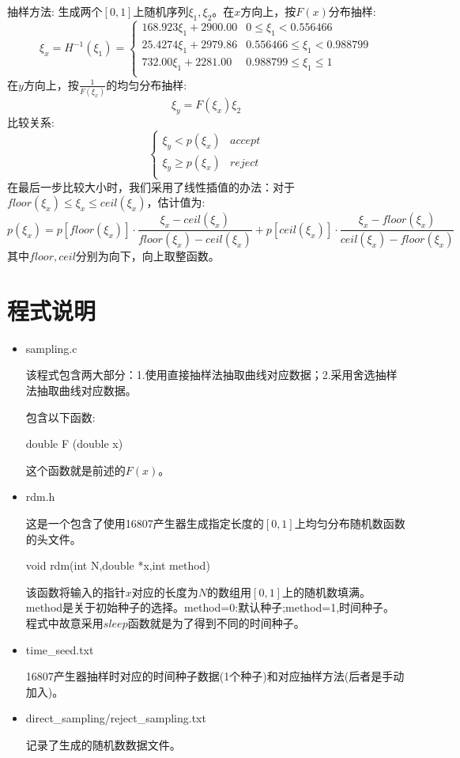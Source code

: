 \documentclass[UTF8]{ctexart}
\begin{document}
\begin{itemize}
	抽样方法:
	生成两个$[0,1]$上随机序列$\xi_1
	,\xi_2$。在$x$方向上，按$F(x)$分布抽样:$$\xi_x=H^{-1}(\xi_1)=\left\{
	\begin{array}{ll}
    168.923\xi_1+2900.00& 0\leq \xi_1<0.556466\\
	25.4274\xi_1+2979.86 & 0.556466\leq \xi_1 <0.988799\\
	732.00\xi_1+2281.00 & 0.988799\leq \xi_1 \leq 1\\
	\end{array}
	\right.$$
	在$y$方向上，按$\frac{1}{F(\xi_x)}$的均匀分布抽样:$$\xi_y=F(\xi_x)\xi_2$$
	比较关系:
	$$\left\{
	\begin{array}{lc}
	\xi_y<p(\xi_x)& accept\\
	\xi_y\geq p(\xi_x)& reject\\
	\end{array}
	\right.
	$$
	在最后一步比较大小时，我们采用了线性插值的办法：对于$floor(\xi_x)\leq\xi_x\leq ceil(\xi_x)$，估计值为:
	$$p(\xi_x)=p[floor(\xi_x)]\cdot\frac{\xi_x-ceil(\xi_x)}{floor(\xi_x)-ceil(\xi_x)}+p[ceil(\xi_x)]\cdot\frac{\xi_x-floor(\xi_x)}{ceil(\xi_x)-floor(\xi_x)}$$
	其中$floor,ceil$分别为向下，向上取整函数。
	\end{itemize}
	
	\section{程式说明}
	\begin{itemize}
		\item sampling.c
		
		该程式包含两大部分：1.使用直接抽样法抽取曲线对应数据；2.采用舍选抽样法抽取曲线对应数据。
	
		包含以下函数:
		
		\subitem double F (double x)
		
		这个函数就是前述的$F(x)$。
		
		\item rdm.h
			
		这是一个包含了使用16807产生器生成指定长度的$[0,1]$上均匀分布随机数函数的头文件。
		
		\subitem void rdm(int N,double *x,int method)
		
		该函数将输入的指针$x$对应的长度为$N$的数组用$[0,1]$上的随机数填满。method是关于初始种子的选择。method=0:默认种子;method=1,时间种子。程式中故意采用$sleep$函数就是为了得到不同的时间种子。
		
		\item time\_seed.txt
		
		16807产生器抽样时对应的时间种子数据(1个种子)和对应抽样方法(后者是手动加入)。
		
		\item direct\_sampling/reject\_sampling.txt
		
		记录了生成的随机数数据文件。
	\end{itemize}
	
\end{document}
